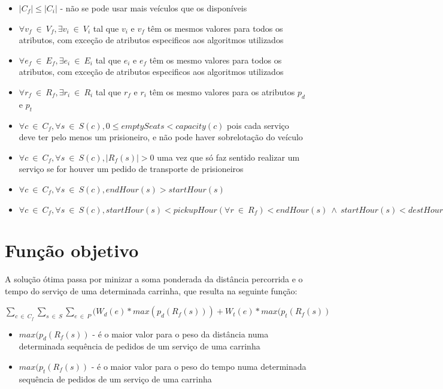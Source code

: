 \documentclass[article, a4paper, 12pt, oneside]{memoir}
\begin{document}
\begin{itemize}
	\item $\vert C_f \vert \leq \vert C_i \vert $ - não se pode usar mais veículos que os disponíveis
	\item $\forall v_f ~ \in ~ V_f, \exists v_i ~ \in ~ V_i$ tal que $v_i$ e $v_f$ têm os mesmos valores para todos os atributos, com exceção de atributos especificos aos algoritmos utilizados
	\item $\forall e_f ~ \in ~ E_f, \exists e_i ~ \in ~ E_i$ tal que $e_i$ e $e_f$ têm os mesmo valores para todos os atributos, com exceção de atributos especificos aos algoritmos utilizados
	\item $\forall r_f ~ \in ~ R_f, \exists r_i ~ \in ~ R_i$ tal que $r_f$ e $r_i$ têm os mesmo valores para os atributos $p_d$ e $p_t$
	\item $\forall c ~ \in ~ C_f, \forall s ~ \in ~ S(c), 0 \leq emptySeats < capacity(c)$ pois cada serviço deve ter pelo menos um prisioneiro, e não pode haver sobrelotação do veículo
	\item $\forall c ~ \in ~ C_f, \forall s ~ \in ~ S(c), \vert R_f(s) \vert > 0$ uma vez que só faz sentido realizar um serviço se for houver um pedido de transporte de prisioneiros
	\item $\forall c ~ \in ~ C_f, \forall s ~ \in ~ S(c), endHour(s) > startHour(s)$
	\item $\forall c ~ \in ~ C_f, \forall s ~ \in ~ S(c), startHour(s) < pickupHour(\forall r ~ \in ~ R_f) < endHour(s) ~ \wedge ~ startHour(s) < destHour(\forall r ~ \in ~ R_f) \leq endHour(s)$
\end{itemize}

\section{Função objetivo}

A solução ótima passa por minizar a soma ponderada da distância percorrida e o tempo do serviço de uma determinada carrinha, que resulta na seguinte função:

$\sum_{c ~ \in ~ C_f} \sum_{s ~ \in ~ S} \sum_{e ~ \in ~ P} (W_d(e) * max(p_d(R_f(s))) + W_t(e) * max(p_t(R_f(s))$

\begin{itemize}
	\item $max(p_d(R_f(s))$ - é o maior valor para o peso da distância numa determinada sequência de pedidos de um serviço de uma carrinha 
	\item $max(p_t(R_f(s))$ - é o maior valor para o peso do tempo numa determinada sequência de pedidos de um serviço de uma carrinha
\end{itemize}
\end{document}
